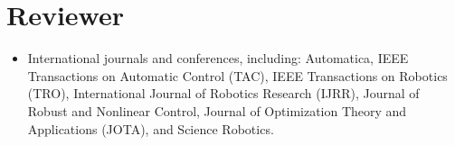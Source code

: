 \documentclass[11pt,a4paper,sans]{moderncv}
\begin{document}
\section{Reviewer}


\begin{itemize}



\item
International journals and conferences, including:
Automatica,
IEEE Transactions on Automatic Control (TAC),
IEEE Transactions on Robotics (TRO),
International Journal of Robotics Research (IJRR),
Journal of Robust and Nonlinear Control,
Journal of Optimization Theory and Applications (JOTA), and
Science Robotics.

\end{itemize}



%
%
%
%
%
%

\end{document}
